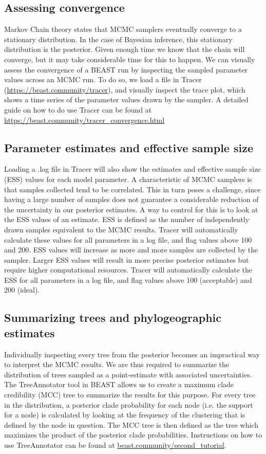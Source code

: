 \documentclass{article}
\newcommand{\code}[1]{
{\upshape\ttfamily{#1}}}
\begin{document}
\subsection*{Assessing convergence}

Markov Chain theory states that MCMC samplers eventually converge to a stationary distribution. In the case of Bayesian inference, this stationary distribution is the posterior. Given enough time we know that the chain will converge, but it may take considerable time for this to happen. We can visually assess the convergence of a BEAST run by inspecting the sampled parameter values across an MCMC run. To do so, we load a \code{.log} file in Tracer (\url{https://beast.community/tracer}), and visually inspect the trace plot, which shows a time series of the parameter values drawn by the sampler. A detailed guide on how to do use Tracer can be found at \url{https://beast.community/tracer_convergence.html}

\subsection*{Parameter estimates and effective sample size}

Loading a .log file in Tracer will also show the estimates and effective sample size (ESS) values for each model parameter. A characteristic of MCMC samplers is that samples collected tend to be correlated. This in turn poses a challenge, since having a large number of samples does not guarantee a considerable reduction of the uncertainty in our posterior estimates. A way to control for this is to look at the ESS values of an estimate. ESS is defined as the number of independently drawn samples equivalent to the MCMC results. Tracer will automatically calculate these values for all parameters in a log file, and flag values above 100 and 200. ESS values will increase as more and more samples are collected by the sampler. Larger ESS values will result in more precise posterior estimates but require higher computational resources. Tracer will automatically calculate the ESS for all parameters in a log file, and flag values above 100 (acceptable) and 200 (ideal).

\subsection*{Summarizing trees and phylogeographic estimates}

Individually inspecting every tree from the posterior becomes an impractical way to interpret the MCMC results. We are thus required to summarize the distribution of trees sampled as a point-estimate with associated uncertainties. The TreeAnnotator tool in BEAST allows us to create a maximum clade credibility (MCC) tree to summarize the results for this purpose. For every tree in the distribution, a posterior clade probability for each node (i.e. the support for a node) is calculated by looking at the frequency of the clustering that is defined by the node in question. The MCC tree is then defined as the tree which maximizes the product of the posterior clade probabilities. Instructions on how to use TreeAnnotator can be found at \url{beast.community/second_tutorial}. \\
\end{document}
